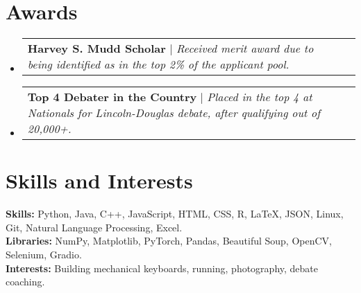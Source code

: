 \documentclass[letterpaper,10pt]{article}
\makeatletter
\newcommand{\resumeProjectHeading}[2]{
    \item
    \begin{tabular*}{0.97\textwidth}{l@{\extracolsep{\fill}}r}
      \small#1 & #2 \\
    \end{tabular*}\vspace{-7pt}
}
\newcommand{\resumeSubHeadingListStart}{\begin{itemize}[leftmargin=0.15in, label={}]}
\newcommand{\resumeSubHeadingListEnd}{\end{itemize}}
\makeatother
\begin{document}
\section{Awards}
    \resumeSubHeadingListStart
    \resumeProjectHeading
          {\textbf{Harvey S. Mudd Scholar} $|$ \emph{Received merit award  due to being identified as in the top 2\% of the applicant pool.}}{}
    \resumeProjectHeading
          {\textbf{Top 4 Debater in the Country} $|$ \emph{Placed in the top 4 at Nationals for Lincoln-Douglas debate, after qualifying out of 20,000+.}}{}

    \resumeSubHeadingListEnd
  

%
\section{Skills and Interests}
\begin{itemize}[leftmargin=0.15in, label={}]
   \small{\item{
    \textbf{Skills:}{ Python, Java, C++, JavaScript, HTML, CSS, R, LaTeX, JSON, Linux, Git, Natural Language Processing, Excel.} \\
    \textbf{Libraries:}{ NumPy, Matplotlib, PyTorch, Pandas, Beautiful Soup, OpenCV, Selenium, Gradio.} \\
    \textbf{Interests:}{ Building mechanical keyboards, running, photography, debate coaching.} \\
   }}
\end{itemize}

\end{document}
